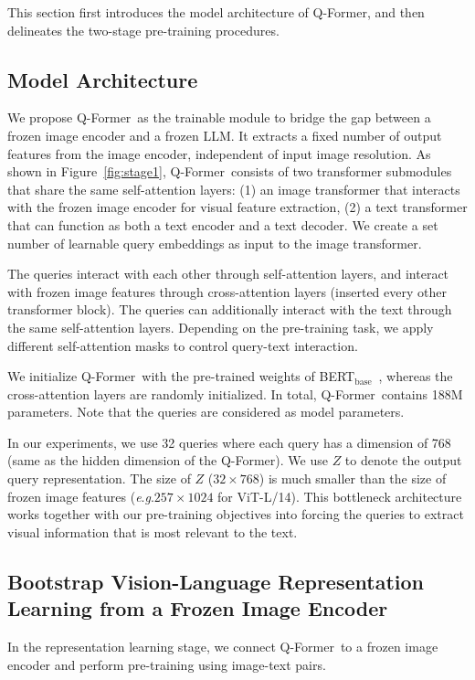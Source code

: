 This section first introduces the model architecture of Q-Former, and then delineates the two-stage pre-training procedures.

\subsection{Model Architecture}

We propose Q-Former~as the trainable module to bridge the gap between a frozen image encoder and a frozen LLM. It extracts a fixed number of output features from the image encoder, independent of input image resolution. As shown in Figure~\ref{fig:stage1},
Q-Former~consists of two transformer submodules that share the same self-attention layers: (1) an image transformer that interacts with the frozen image encoder for visual feature extraction, (2) a text transformer that can function as both a text encoder and a text decoder. We create a set number of learnable query embeddings as input to the image transformer.

The queries interact with each other through self-attention layers, and interact with frozen image features through cross-attention layers (inserted every other transformer block). The queries can additionally interact with the text through the same self-attention layers. Depending on the pre-training task, we apply different self-attention masks to control query-text interaction.

We initialize Q-Former~with the pre-trained weights of BERT$_\text{base}$~\cite{bert}, whereas the cross-attention layers are randomly initialized. In total, Q-Former~contains 188M parameters. Note that the queries are considered as model parameters.

In our experiments, we use 32 queries where each query has a dimension of 768 (same as the hidden dimension of the Q-Former). We use $Z$ to denote the output query representation. The size of $Z$ ($32\times768$) is much smaller than the size of frozen image features (\textit{e}.\textit{g}.$257\times1024$ for ViT-L/14). This bottleneck architecture works together with our pre-training objectives into forcing the queries to extract visual information that is most relevant to the text.

\subsection{Bootstrap Vision-Language Representation Learning from a Frozen Image Encoder}

In the representation learning stage, we connect Q-Former~to a frozen image encoder and perform pre-training using image-text pairs.

